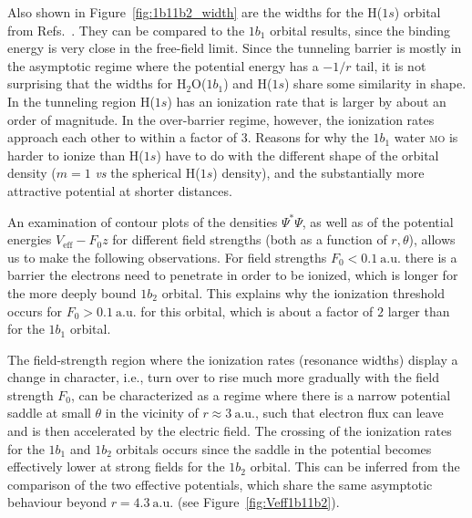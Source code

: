 Also shown in Figure~\ref{fig:1b11b2_width} are the widths for the
H($1s$) orbital from Refs.~\cite{Telnov_1989,Kolosov_1987}. They can
be compared to the $1b_{1}$ orbital results, since the binding energy
is very close in the free-field limit. Since the tunneling barrier is
mostly in the asymptotic regime where the potential energy has a
$-1/r$ tail, it is not surprising that the widths for
H$_{2}$O($1b_{1}$) and H($1s$) share some similarity in shape. In the
tunneling region H($1s$) has an ionization rate that is larger by
about an order of magnitude. In the over-barrier regime, however, the
ionization rates approach each other to within a factor of 3. Reasons
for why the $1b_1$ water \textsc{mo} is harder to ionize than
H($1s$) have to do with the different shape of the orbital density
($m=1$ \emph{vs} the spherical H($1s$) density), and the substantially
more attractive potential at shorter distances.

An examination of contour plots of the densities $\Psi^{*}\Psi$, as
well as of the potential energies $V_{\mathrm{eff}} - F_{0}z$ for
different field strengths (both as a function of $r,\theta$), allows
us to make the following observations. For field strengths $F_{0} <
0.1\ \mathrm{a.u.}$ there is a barrier the electrons need to penetrate
in order to be ionized, which is longer for the more deeply bound
$1b_{2}$ orbital.
This explains why the ionization threshold occurs for $F_{0} >
0.1\ \mathrm{a.u.}$ for this orbital, which is about a factor of $2$
larger than for the $1b_{1}$ orbital.

The field-strength region where the ionization rates (resonance
widths) display a change in character, i.e., turn over to rise much
more gradually with the field strength $F_{0}$, can be characterized
as a regime where there is a narrow potential saddle at small $\theta$
in the vicinity of $r \approx 3\ \mathrm{a.u.}$, such that electron
flux can leave and is then accelerated by the electric field. The
crossing of the ionization rates for the $1b_{1}$ and $1b_{2}$
orbitals occurs since the saddle in the potential becomes effectively
lower at strong fields for the $1b_{2}$ orbital. This can be inferred
from the comparison of the two effective potentials, which share the
same asymptotic behaviour beyond $r = 4.3\ \mathrm{a.u.}$ (see
Figure~\ref{fig:Veff1b11b2}).

